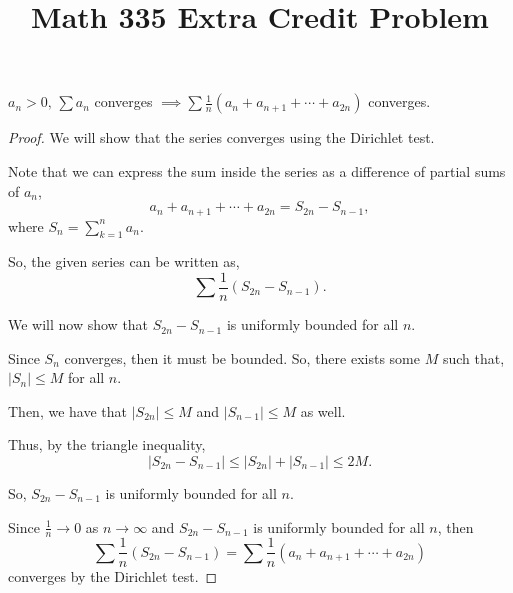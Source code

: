 \documentclass{article}
\title{Math 335 Extra Credit Problem}
\begin{document}
\maketitle
\begin{problem}
$a_n > 0,\, \sum a_n$ converges $\implies \sum \frac{1}{n}\left( a_n + a_{n+1} + \cdots + a_{2n}\right)$ converges.
\end{problem}
\begin{proof}
	We will show that the series converges using the Dirichlet test.

	Note that we can express the sum inside the series as a difference of partial sums of $a_n$, \[
		a_n + a_{n+1} + \cdots + a_{2n} = S_{2n}-S_{n-1}
		,\] where $S_n = \sum_{k=1}^{n} a_n$.

	So, the given series can be written as, \[
		\sum \frac{1}{n} \left( S_{2n}-S_{n-1}\right)
		.\]

	We will now show that $S_{2n}-S_{n-1}$ is uniformly bounded for all $n$.

	Since $S_n$ converges, then it must be bounded.
	So, there exists some  $M$ such that,  $|S_n|\le M$ for all $n$.

	Then, we have that $|S_{2n}|\le M$ and $|S_{n-1}|\le M$ as well.

	Thus, by the triangle inequality,  \[
		|S_{2n}-S_{n-1}|\le |S_{2n}| + |S_{n-1}| \le 2M
		.\]

	So, $S_{2n}-S_{n-1}$ is uniformly bounded for all $n$.


	Since $\frac{1}{n} \to 0$ as $n\to \infty$ and $S_{2n}-S_{n-1}$ is uniformly bounded for all $n$, then  \[
		\sum \frac{1}{n} \left( S_{2n}-S_{n-1}\right) = \sum \frac{1}{n} \left( a_n+a_{n+1}+\cdots+a_{2n} \right)
	\] converges by the Dirichlet test.
\end{proof}
\end{document}
